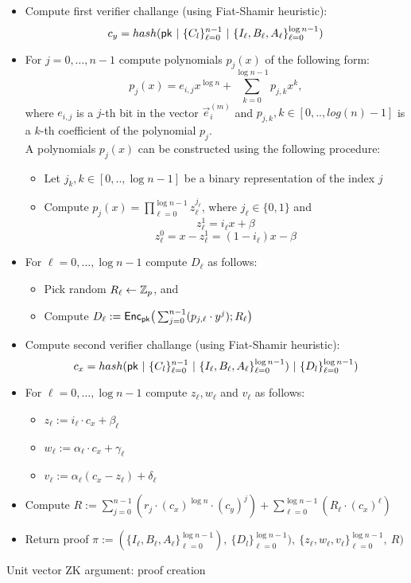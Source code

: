 {\begin{itemize}
\item Compute first verifier challange (using Fiat-Shamir heuristic):
\[c_y=hash(\pk\ |\ \{C_l\}_{\ell=0}^{n-1}\ |\ \{I_\ell,B_\ell,A_\ell\}_{\ell=0}^{\log n-1})\]

\item For $j = 0,\ldots, n-1$ compute polynomials $p_j(x)$ of the following form:
\[p_j(x) = e_{i,j} x^{\log n} + \sum_{k=0}^{\log n -1} p_{j,k} x^k,\]
where $e_{i,j}$ is a $j$-th bit in the vector $\vec{e}_i^{(m)}$ and $p_{j,k}, k \in [0,..,log(n)-1]$ is a $k$-th coefficient of the polynomial $p_{j}$.\\
A polynomials $p_j(x)$ can be constructed using the following procedure:
\begin{itemize}
    \item Let $j_k, k \in [0,..,\log n-1]$ be a binary representation of the index $j$
    \item Compute $p_j(x)=\prod_{\ell=0}^{\log n-1} z_{\ell}^{j_\ell}$, where $j_\ell \in \{0,1\}$ and
    \[z^1_{\ell}=i_{\ell} x + \beta\]
    \[z^0_{\ell}=x-z^1_{\ell}=(1-i_{\ell}) x - \beta\]
\end{itemize}

\item For $\ell = 0,\ldots, \log n-1$ compute $D_{\ell}$ as follows:
    \begin{itemize}
    \item Pick random $R_\ell\leftarrow \mathbb{Z}_p$, and 
    \item Compute $D_\ell:=\mathsf{Enc}_{\mathsf{pk}}\big(\sum_{j=0}^{n-1} (p_{j,\ell} \cdot y^j);R_\ell \big)$
    \end{itemize}

\item Compute second verifier challange (using Fiat-Shamir heuristic):
\[c_x=hash(\pk\ |\ \{C_l\}_{\ell=0}^{n-1}\ |\ \{I_\ell,B_\ell,A_\ell\}_{\ell=0}^{\log n-1})\ |\ \{D_l\}_{\ell=0}^{\log n-1})\]

\item For $\ell = 0,\ldots, \log n-1$ compute $z_{\ell}, w_{\ell}$ and $v_{\ell}$ as follows:
    \begin{itemize}
        \item $z_\ell:= i_\ell \cdot c_x + \beta_\ell$
        \item $w_\ell:= \alpha_\ell \cdot c_x + \gamma_\ell$
        \item $v_\ell:= \alpha_\ell (c_x-z_\ell) + \delta_\ell$
    \end{itemize}

\item Compute $R:= \sum_{j=0}^{n-1}( r_j \cdot (c_x)^{\log n} \cdot (c_y)^j)  + \sum_{\ell=0}^{\log n -1} (R_\ell \cdot (c_x)^\ell)$

\item Return proof $\pi:=(\{I_\ell,B_\ell,A_\ell\}_{\ell=0}^{\log n-1}),\ \{D_l\}_{\ell=0}^{\log n-1}),\ \{z_\ell,w_\ell,v_\ell\}_{\ell=0}^{\log n-1},\ R)$
\end{itemize}
}{Unit vector ZK argument: proof creation  \label{fig:unit_zk_prover}}

